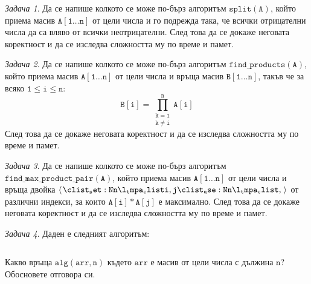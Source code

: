 \documentclass{article}
\theoremstyle{definition}
\theoremstyle{plain}
\theoremstyle{remark}
\newtheorem{problem}{Задача}
\theoremstyle{definition}
\begin{document}
\begin{problem}
Да се напише колкото се може по-бърз алгоритъм $\mathtt{split(A)}$, който приема масив $\mathtt{A[1 \dots n]}$ от цели числа и го подрежда така, че всички отрицателни числа да са вляво от всички неотрицателни.
След това да се докаже неговата коректност и да се изследва сложността му по време и памет.
\end{problem}

\begin{problem}
Да се напише колкото се може по-бърз алгоритъм $\mathtt{find\_products(A)}$, който приема масив $\mathtt{A[1 \dots n]}$ от цели числа и връща масив $\mathtt{B[1 \dots n]}$, такъв че за всяко $\mathtt{1 \leq i \leq n}$:
\[
  \mathtt{B[i] = \prod\limits_{\substack{\mathtt{k = 1} \\ \mathtt{k \neq i}}}^{n} A[i]}
\]
След това да се докаже неговата коректност и да се изследва сложността му по време и памет.
\end{problem}

\begin{problem}
Да се напише колкото се може по-бърз алгоритъм $\mathtt{find\_max\_product\_pair(A)}$, който приема масив $\mathtt{A[1 \dots n]}$ от цели числа и връща двойка $\mathtt{\opair{i, j}}$ от различни индекси, за които $\mathtt{A[i] * A[j]}$ е максимално.
След това да се докаже неговата коректност и да се изследва сложността му по време и памет.
\end{problem}

\begin{problem}
Даден е следният алгоритъм:
\inputminted[linenos]{c++}{algorithms/alg.cpp}
Какво връща $\mathtt{alg(arr, n)}$ където $\mathtt{arr}$ е масив от цели числа с дължина $\mathtt{n}$?
Обосновете отговора си.
\end{problem}
\end{document}
